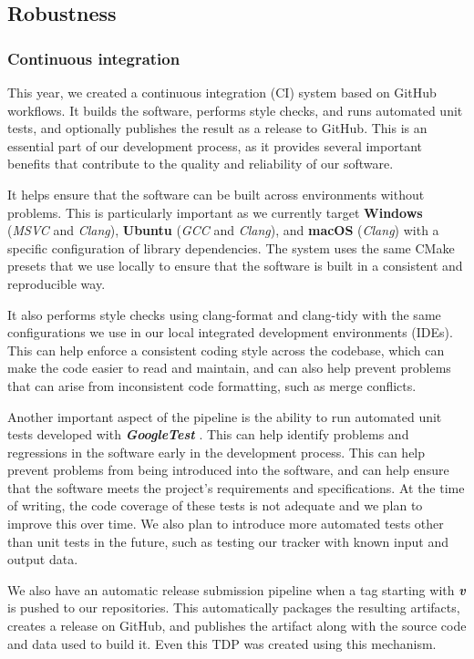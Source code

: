 \documentclass[runningheads]{llncs}
\begin{document}
\subsection{Robustness}

\subsubsection{Continuous integration}
This year, we created a continuous integration (CI) system based on GitHub workflows. It builds the software, performs style checks, and runs automated unit tests, and optionally publishes the result as a release to GitHub. This is an essential part of our development process, as it provides several important benefits that contribute to the quality and reliability of our software.

\indent It helps ensure that the software can be built across environments without problems. This is particularly important as we currently target \textbf{Windows} (\textit{MSVC} and \textit{Clang}), \textbf{Ubuntu} (\textit{GCC} and \textit{Clang}), and \textbf{macOS} (\textit{Clang}) with a specific configuration of library dependencies. The system uses the same CMake presets that we use locally to ensure that the software is built in a consistent and reproducible way.

\indent It also performs style checks using clang-format and clang-tidy with the same configurations we use in our local integrated development environments (IDEs). This can help enforce a consistent coding style across the codebase, which can make the code easier to read and maintain, and can also help prevent problems that can arise from inconsistent code formatting, such as merge conflicts.

\indent Another important aspect of the pipeline is the ability to run automated unit tests developed with \textbf{\textit{GoogleTest}} \cite{ref_3rd-party_gtest}. This can help identify problems and regressions in the software early in the development process. This can help prevent problems from being introduced into the software, and can help ensure that the software meets the project's requirements and specifications. At the time of writing, the code coverage of these tests is not adequate and we plan to improve this over time. We also plan to introduce more automated tests other than unit tests in the future, such as testing our tracker with known input and output data.

\indent We also have an automatic release submission pipeline when a tag starting with \textbf{\textit{v}} is pushed to our repositories. This automatically packages the resulting artifacts, creates a release on GitHub, and publishes the artifact along with the source code and data used to build it. Even this TDP was created using this mechanism.
\end{document}
